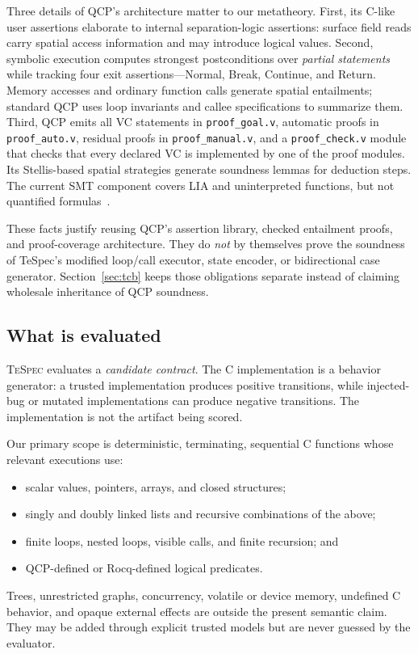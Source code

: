 \documentclass[10pt]{article}
\newcommand{\tespec}{\textsc{TeSpec}}
\newcommand{\rocq}{Rocq}
\begin{document}
Three details of QCP's architecture matter to our metatheory.  First, its
C-like user assertions elaborate to internal separation-logic assertions:
surface field reads carry spatial access information and may introduce
logical values.  Second, symbolic execution computes strongest postconditions
over \emph{partial statements} while tracking four exit assertions---Normal,
Break, Continue, and Return.  Memory accesses and ordinary function calls
generate spatial entailments; standard QCP uses loop invariants and callee
specifications to summarize them.  Third, QCP emits all VC statements in
\texttt{proof\_goal.v}, automatic proofs in \texttt{proof\_auto.v}, residual
proofs in \texttt{proof\_manual.v}, and a \texttt{proof\_check.v} module that
checks that every declared VC is implemented by one of the proof modules.
Its Stellis-based spatial strategies generate soundness lemmas for deduction
steps.  The current SMT component covers LIA and uninterpreted functions, but
not quantified formulas~\citep{wu2026qcp}.

These facts justify reusing QCP's assertion library, checked entailment proofs,
and proof-coverage architecture.  They do \emph{not} by themselves prove the
soundness of TeSpec's modified loop/call executor, state encoder, or
bidirectional case generator.  Section~\ref{sec:tcb} keeps those obligations
separate instead of claiming wholesale inheritance of QCP soundness.

\subsection{What is evaluated}

\tespec{} evaluates a \emph{candidate contract}.  The C implementation is a
behavior generator: a trusted implementation produces positive transitions,
while injected-bug or mutated implementations can produce negative
transitions.  The implementation is not the artifact being scored.

Our primary scope is deterministic, terminating, sequential C functions whose
relevant executions use:
\begin{itemize}[leftmargin=1.4em]
  \item scalar values, pointers, arrays, and closed structures;
  \item singly and doubly linked lists and recursive combinations of the above;
  \item finite loops, nested loops, visible calls, and finite recursion; and
  \item QCP-defined or \rocq-defined logical predicates.
\end{itemize}
Trees, unrestricted graphs, concurrency, volatile or device memory, undefined
C behavior, and opaque external effects are outside the present semantic
claim.  They may be added through explicit trusted models but are never guessed
by the evaluator.
\end{document}
